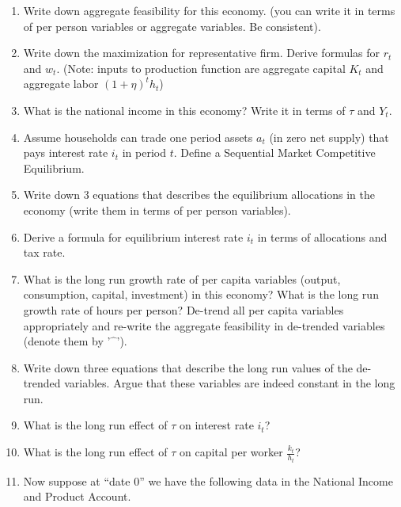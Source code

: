 \documentclass[10pt, a4paper]{article}
\begin{document}
    \begin{enumerate}
    \item Write down aggregate feasibility for this economy. (you can write it in terms of per person variables or aggregate variables. Be consistent).

    \item Write down the maximization for representative firm. Derive formulas for $r_t$ and $w_t$. (Note: inputs to production function are aggregate capital $K_t$ and aggregate labor $(1+\eta)^t h_t$)

    \item What is the national income in this economy? Write it in terms of $\tau$ and $Y_t$.

    \item Assume households can trade one period assets $a_t$ (in zero net supply) that pays interest rate $i_t$ in period $t$. Define a Sequential Market Competitive Equilibrium.

    \item Write down 3 equations that describes the equilibrium allocations in the economy (write them in terms of per person variables).

    \item Derive a formula for equilibrium interest rate $i_t$ in terms of allocations and tax rate.

    \item What is the long run growth rate of per capita variables (output, consumption, capital, investment) in this economy? What is the long run growth rate of hours per person? De-trend all per capita variables appropriately and re-write the aggregate feasibility in de-trended variables (denote them by '$\hat{\phantom{x}}$').

    \item Write down three equations that describe the long run values of the de-trended variables. Argue that these variables are indeed constant in the long run.

    \item What is the long run effect of $\tau$ on interest rate $i_t$?

    \item What is the long run effect of $\tau$ on capital per worker $\frac{k_t}{h_t}$?

    \item Now suppose at ``date 0'' we have the following data in the National Income and Product Account.


\end{enumerate}
\end{document}
